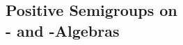 
\begin{partbacktext}
\part[Positive Semigroups on \CA- and \WA-Algebras]{Positive Semigroups on \\ \CA- and \WA-Algebras}
\end{partbacktext}